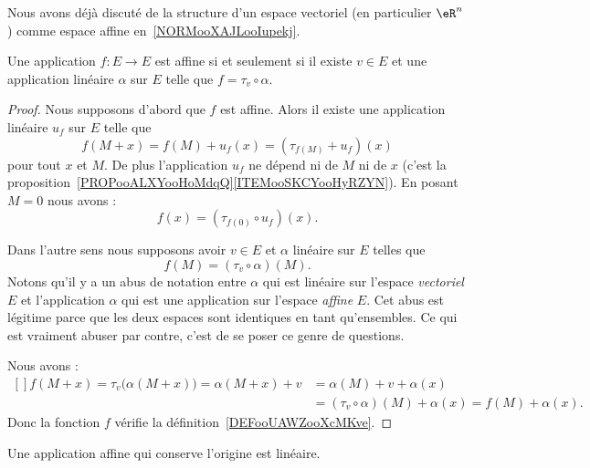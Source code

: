 Nous avons déjà discuté de la structure d'un espace vectoriel (en particulier \( \eR^n\)) comme espace affine en~\ref{NORMooXAJLooIupekj}.


\begin{lemma}\label{LEMooZZAIooOMiayy}
    Une application \( f\colon E\to E\) est affine si et seulement si il existe \( v\in E\) et une application linéaire \( \alpha\) sur \( E\) telle que \( f=\tau_v\circ\alpha\).
\end{lemma}

\begin{proof}
    Nous supposons d'abord que \( f\) est affine. Alors il existe une application linéaire \( u_f\) sur \( E\) telle que
    \begin{equation}
        f(M+x)=f(M)+u_f(x)=(\tau_{f(M)}+u_f)(x)
    \end{equation}
    pour tout \( x\) et \( M\). De plus l'application \( u_f\) ne dépend ni de \( M\) ni de \( x\) (c'est la proposition~\ref{PROPooALXYooHoMdqQ}\ref{ITEMooSKCYooHyRZYN}). En posant \( M=0\) nous avons :
    \begin{equation}
        f(x)=(\tau_{f(0)}\circ u_f)(x).
    \end{equation}

    Dans l'autre sens nous supposons avoir \( v\in E\) et \( \alpha\) linéaire sur \( E\) telles que
    \begin{equation}
        f(M)=(\tau_v\circ\alpha)(M).
    \end{equation}
    Notons qu'il y a un abus de notation entre \( \alpha\) qui est linéaire sur l'espace \emph{vectoriel} \( E\) et l'application \( \alpha\) qui est une application sur l'espace \emph{affine} \( E\). Cet abus est légitime parce que les deux espaces sont identiques en tant qu'ensembles. Ce qui est vraiment abuser par contre, c'est de se poser ce genre de questions.

    Nous avons :
    \begin{equation}
        \begin{aligned}[]
            f(M+x)=\tau_v\big( \alpha(M+x) \big)=\alpha(M+x)+v&=\alpha(M)+v+\alpha(x)
            \\&=(\tau_v\circ\alpha)(M)+\alpha(x)=f(M)+\alpha(x).
        \end{aligned}
    \end{equation}
    Donc la fonction \( f\) vérifie la définition~\ref{DEFooUAWZooXcMKve}.
\end{proof}

\begin{corollary}       \label{CORooATCNooUwEPNI}
    Une application affine qui conserve l'origine est linéaire.
\end{corollary}

